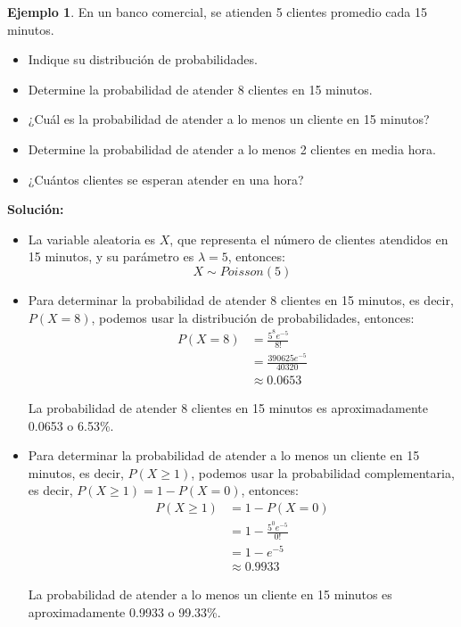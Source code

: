 \documentclass{article}
\theoremstyle{definition}
\newtheorem{example}[definition]{Ejemplo}
\theoremstyle{plain}
\theoremstyle{remark}
\begin{document}
\begin{example}
En un banco comercial, se atienden 5 clientes promedio cada 15 minutos.

\begin{itemize}
\item Indique su distribución de probabilidades.
\item Determine la probabilidad de atender 8 clientes en 15 minutos.
\item ¿Cuál es la probabilidad de atender a lo menos un cliente en 15 minutos?
\item Determine la probabilidad de atender a lo menos 2 clientes en media hora.
\item ¿Cuántos clientes se esperan atender en una hora?
\end{itemize}

\textbf{Solución:}

\begin{itemize}
\item La variable aleatoria es $X$, que representa el número de clientes atendidos en 15 minutos, y su parámetro es $\lambda = 5$, entonces:
\[
X \sim Poisson(5)
\]

\item Para determinar la probabilidad de atender 8 clientes en 15 minutos, es decir, $P(X = 8)$, podemos usar la distribución de probabilidades, entonces:
\begin{align*}
P(X = 8) &= \frac{5^8 e^{-5}}{8!} \\
&= \frac{390625 e^{-5}}{40320} \\
&\approx 0.0653
\end{align*}

La probabilidad de atender 8 clientes en 15 minutos es aproximadamente 0.0653 o 6.53\%.

\item Para determinar la probabilidad de atender a lo menos un cliente en 15 minutos, es decir, $P(X \geq 1)$, podemos usar la probabilidad complementaria, es decir, $P(X \geq 1) = 1 - P(X = 0)$, entonces:
\begin{align*}
P(X \geq 1) &= 1 - P(X = 0) \\
&= 1 - \frac{5^0 e^{-5}}{0!} \\
&= 1 - e^{-5} \\
&\approx 0.9933
\end{align*}

La probabilidad de atender a lo menos un cliente en 15 minutos es aproximadamente 0.9933 o 99.33\%.


\end{itemize}
\end{example}
\end{document}
